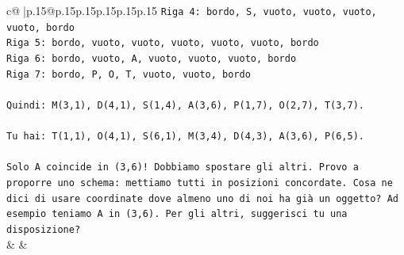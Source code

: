 \documentclass{article}
\begin{document}
{\begin{supertabular}{c@{$\;$}|p{.15\linewidth}@{}p{.15\linewidth}p{.15\linewidth}p{.15\linewidth}p{.15\linewidth}p{.15\linewidth}}
{{{\texttt{Riga 4: bordo, S, vuoto, vuoto, vuoto, vuoto, bordo} \\
\texttt{Riga 5: bordo, vuoto, vuoto, vuoto, vuoto, vuoto, bordo} \\
\texttt{Riga 6: bordo, vuoto, A, vuoto, vuoto, vuoto, bordo} \\
\texttt{Riga 7: bordo, P, O, T, vuoto, vuoto, bordo} \\
\\ 
\texttt{Quindi: M(3,1), D(4,1), S(1,4), A(3,6), P(1,7), O(2,7), T(3,7).} \\
\\ 
\texttt{Tu hai: T(1,1), O(4,1), S(6,1), M(3,4), D(4,3), A(3,6), P(6,5).} \\
\\ 
\texttt{Solo A coincide in (3,6)! Dobbiamo spostare gli altri. Provo a proporre uno schema: mettiamo tutti in posizioni concordate. Cosa ne dici di usare coordinate dove almeno uno di noi ha già un oggetto? Ad esempio teniamo A in (3,6). Per gli altri, suggerisci tu una disposizione?} \\
            }
        }
    }
    & & \\ \\


\end{supertabular}}
\end{document}
